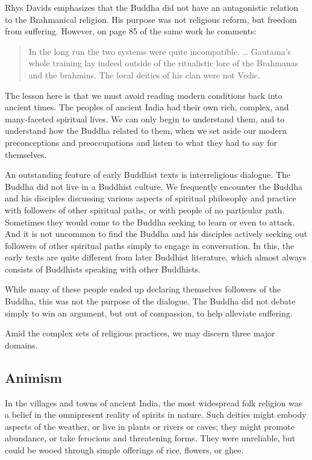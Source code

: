 \documentclass[12pt,openany]{book}%
\begin{document}
Rhys Davids emphasizes that the Buddha did not have an antagonistic relation to the Brahmanical religion. His purpose was not religious reform, but freedom from suffering. However, on page 85 of the same work he comments:

\begin{quotation}%
In the long run the two systems were quite incompatible. … Gautama’s whole training lay indeed outside of the ritualistic lore of the Brahmanas and the brahmins. The local deities of his clan were not Vedic.

%
\end{quotation}

The lesson here is that we must avoid reading modern conditions back into ancient times. The peoples of ancient India had their own rich, complex, and many-faceted spiritual lives. We can only begin to understand them, and to understand how the Buddha related to them, when we set aside our modern preconceptions and preoccupations and listen to what they had to say for themselves.

An outstanding feature of early Buddhist texts is interreligious dialogue. The Buddha did not live in a Buddhist culture. We frequently encounter the Buddha and his disciples discussing various aspects of spiritual philosophy and practice with followers of other spiritual paths, or with people of no particular path. Sometimes they would come to the Buddha seeking to learn or even to attack. And it is not uncommon to find the Buddha and his disciples actively seeking out followers of other spiritual paths simply to engage in conversation. In this, the early texts are quite different from later Buddhist literature, which almost always consists of Buddhists speaking with other Buddhists.

While many of these people ended up declaring themselves followers of the Buddha, this was not the purpose of the dialogue. The Buddha did not debate simply to win an argument, but out of compassion, to help alleviate suffering.

Amid the complex sets of religious practices, we may discern three major domains.

\subsection*{Animism}

In the villages and towns of ancient India, the most widespread folk religion was a belief in the omnipresent reality of spirits in nature. Such deities might embody aspects of the weather, or live in plants or rivers or caves; they might promote abundance, or take ferocious and threatening forms. They were unreliable, but could be wooed through simple offerings of rice, flowers, or ghee.
\end{document}
